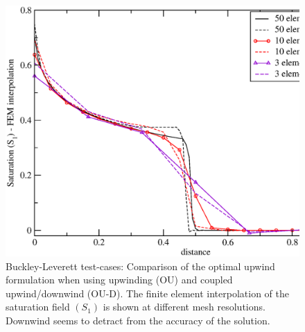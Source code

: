 \begin{figure}[h]
\begin{center}
\includegraphics[width=1.\textwidth]{./diagrams/bl-upwind-v-up-and-down}
\end{center}
\caption{Buckley-Leverett test-cases: Comparison of the optimal upwind formulation when using upwinding (OU) and coupled upwind/downwind (OU-D). The finite element interpolation of the saturation field $\left(S_{1}\right)$ is shown at different mesh resolutions. Downwind seems to detract from the accuracy of the solution. \label{bl-upwind-v-up-and-down}}
\end{figure}



